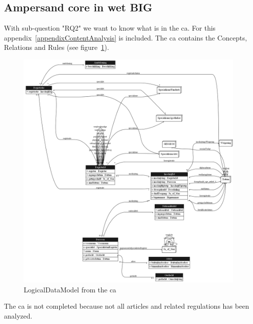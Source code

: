 \subsection{Ampersand core in wet BIG}\label{subsection:ampersand-core-in-wet-big}
With sub-question "\acrlong{RQ2}" we want to know what is in the \acrlong{ca}.
For this appendix~\ref{appendixContentAnalysis} is included.
The \acrlong{ca} contains the Concepts, Relations and Rules (see figure~\ref{fig:LogicalDataModel}).
\begin{figure}[!htp]
    \centering
        \includegraphics[width=1\textwidth]
            {../images/LogicalDataModel.png}
        \caption{LogicalDataModel from the \acrlong{ca}}
    \label{fig:LogicalDataModel}
\end{figure}
The \acrlong{ca} is not completed because not all articles and related regulations has been analyzed.


